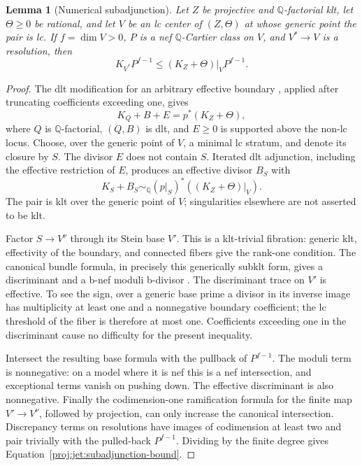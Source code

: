 \documentclass[11pt,letterpaper]{article}
\newcommand{\Q}{\mathbb{Q}}
\newtheorem{lemma}[theorem]{Lemma}
\theoremstyle{definition}
\theoremstyle{remark}
\begin{document}
\begin{lemma}[Numerical subadjunction]\label{proj:jet:subadjunction}
Let \(Z\) be projective and \(\Q\)-factorial klt, let
\(\Theta\ge0\) be rational, and let \(V\) be an lc center of
\((Z,\Theta)\) at whose generic point the pair is lc.
If \(f=\dim V>0\), \(P\) is a nef \(\Q\)-Cartier class on \(V\), and
\(V^*\to V\) is a resolution, then
\begin{equation}\label{proj:jet:subadjunction-bound}
 K_{V^*}P^{f-1}\le (K_Z+\Theta)|_V P^{f-1}.
\end{equation}
\end{lemma}

\begin{proof}
The dlt modification for an arbitrary effective boundary
\cite[Theorem~2.10]{Proj-FujinoHashizume2023}, applied after truncating
coefficients exceeding one, gives
\[
 K_Q+B+E=p^*(K_Z+\Theta),
\]
where \(Q\) is \(\Q\)-factorial, \((Q,B)\) is dlt, and \(E\ge0\)
is supported above the non-lc locus.  Choose, over the generic point
of \(V\), a minimal lc stratum, and denote its closure by \(S\).
The divisor \(E\) does not contain \(S\).  Iterated dlt adjunction,
including the effective restriction of \(E\), produces an effective
divisor \(B_S\) with
\[
 K_S+B_S\sim_{\Q}
 (p|_S)^*((K_Z+\Theta)|_V).
\]
The pair is klt over the generic point of \(V\); singularities elsewhere
are not asserted to be klt.

Factor \(S\to V^\nu\) through its Stein base \(V'\).  This is a
klt-trivial fibration: generic klt, effectivity of the boundary, and
connected fibers give the rank-one condition.  The canonical bundle
formula, in precisely this generically subklt form, gives a
discriminant and a b-nef moduli b-divisor
\cite[Definition~3.1 and Theorem~3.5]{Proj-FujinoGongyoModuli2014}.
The discriminant trace on \(V'\) is effective.  To see the sign,
over a generic base prime a divisor in its inverse image has
multiplicity at least one and a nonnegative boundary coefficient;
the lc threshold of the fiber is therefore at most one.
Coefficients exceeding one in the discriminant cause no difficulty
for the present inequality.

Intersect the resulting base formula with the pullback of \(P^{f-1}\).
The moduli term is nonnegative: on a model where it is nef this is a
nef intersection, and exceptional terms vanish on pushing down.
The effective discriminant is also nonnegative.  Finally the
codimension-one ramification formula for the finite map
\(V'\to V^\nu\), followed by projection, can only increase the
canonical intersection.  Discrepancy terms on resolutions have
images of codimension at least two and pair trivially with the
pulled-back \(P^{f-1}\).  Dividing by the finite degree gives
Equation~\eqref{proj:jet:subadjunction-bound}.
\end{proof}
\end{document}
